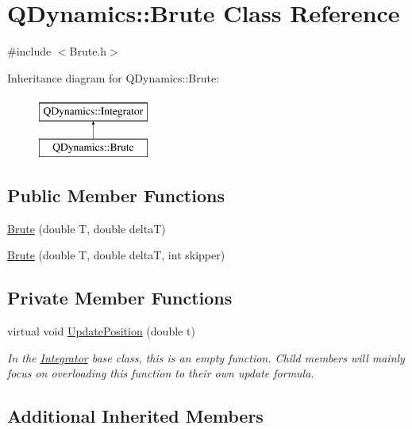 \hypertarget{classQDynamics_1_1Brute}{}\section{Q\+Dynamics\+:\+:Brute Class Reference}
\label{classQDynamics_1_1Brute}


{\ttfamily \#include $<$Brute.\+h$>$}

Inheritance diagram for Q\+Dynamics\+:\+:Brute\+:\begin{figure}[H]
\begin{center}
\leavevmode
\includegraphics[height=2.000000cm]{classQDynamics_1_1Brute}
\end{center}
\end{figure}
\subsection*{Public Member Functions}
\begin{DoxyCompactItemize}
\item 
\hyperlink{classQDynamics_1_1Brute_a2ef1df08140810ffbc9a3e8b97561bbb}{Brute} (double T, double deltaT)
\item 
\hyperlink{classQDynamics_1_1Brute_a5f04abe903e88405c24fb5695db6357f}{Brute} (double T, double deltaT, int skipper)
\end{DoxyCompactItemize}
\subsection*{Private Member Functions}
\begin{DoxyCompactItemize}
\item 
virtual void \hyperlink{classQDynamics_1_1Brute_ac5d4bbe0e34a9f6836f71f40ae8a9eb4}{Update\+Position} (double t)
\begin{DoxyCompactList}\small\item\em In the \hyperlink{classQDynamics_1_1Integrator}{Integrator} base class, this is an empty function. Child members will mainly focus on overloading this function to their own update formula. \end{DoxyCompactList}\end{DoxyCompactItemize}
\subsection*{Additional Inherited Members}


